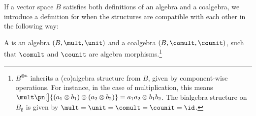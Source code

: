 If a vector space $B$ satisfies both definitions of an algebra and a coalgebra,
we introduce a definition for when the structures are compatible with each other
in the following way:

\begin{definition}[bialgebra]
        A  is an algebra $(B,\mult,\unit)$ and a coalgebra
        $(B,\comult,\counit)$, such that $\comult$ and $\counit$ are algebra
        morphisms.\footnote{
                $B^{\otimes n}$ inherits a (co)algebra structure
                from $B$, given by
                component-wise operations. For instance, in the case of
                multiplication, this
                means $\mult\pn[\big]{(a_1\otimes b_1) \otimes (a_2 \otimes
                b_2)} = a_1a_2 \otimes b_1 b_2$. The bialgebra structure on
                $B_{\emptyset}$ is given by
                $\mult = \unit = \comult = \counit = \id$.
        }
\end{definition}


